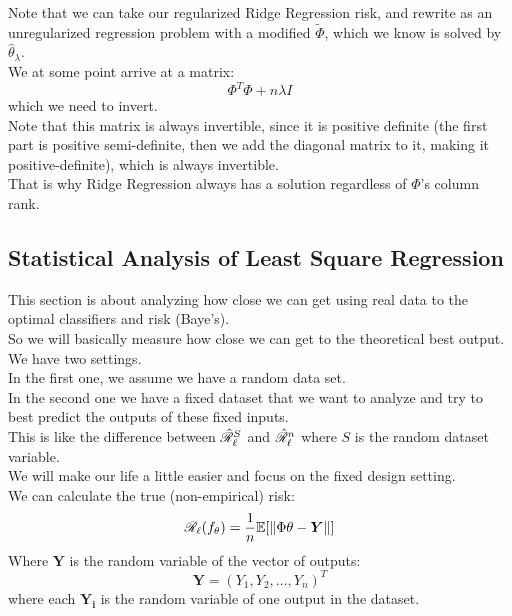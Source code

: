 \documentclass[12pt]{article}
\begin{document}
Note that we can take our regularized
Ridge Regression risk, and rewrite as an 
unregularized regression problem with a modified
$\tilde{\Phi}$, which we know is solved by 
$\hat{\theta}_\lambda$. \\
We at some point arrive at a matrix:
\[ \Phi^T\Phi + n \lambda I \]
which we need to invert. \\
Note that this matrix is always invertible,
since it is positive definite (the first
part is positive semi-definite,
then we add the diagonal matrix to it,
making it positive-definite),
which is always invertible. \\
That is why Ridge Regression always has a
solution regardless of $\Phi$'s column rank. \\

\newpage

\subsection*{Statistical Analysis of Least Square
Regression}

This section is about analyzing how close we can
get using real data to the optimal classifiers
and risk (Baye's). \\

So we will basically measure how close we
can get to the theoretical best output. \\

We have two settings. \\
In the first one, we assume we have a random
data set. \\
In the second one we have a fixed dataset that
we want to analyze and try to best predict the 
outputs of these fixed inputs. \\
This is like the difference between
$\hat{\mathscr{R}}_{\ell}^{S}$ 
and $\hat{\mathscr{R}}_{\ell}^{n}$
where $S$ is the random dataset variable. \\

We will make our life a little easier and
focus on the fixed design setting. \\

We can calculate the true (non-empirical)
risk:
\[ \mathscr{R}_{\ell}{}(f_\theta) = 
\dfrac{1}{n}\mathbb{E}[\|\Phi \theta - \boldsymbol{Y}\|] \]
Where $\boldsymbol{Y}$
is the random variable of the vector of outputs:
\[ \boldsymbol{Y} = (Y_1,Y_2, \dots, Y_n)^T \]
where each $\boldsymbol{Y_i}$
is the random variable of one output in the dataset. \\
\end{document}
